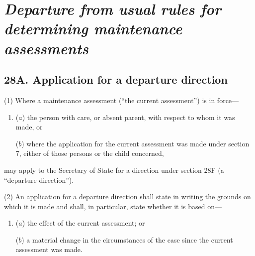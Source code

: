 \documentclass[12pt,a4paper]{article}
\begin{document}
%
%
%

\section{\itshape Departure from usual rules for determining maintenance assessments}

\subsection{28A. Application for a departure direction}

(1) Where a maintenance assessment (“the current assessment”) is in force—
\begin{enumerate}\item[]
($a$) the person with care, or absent parent, with respect to whom it was made, or

($b$) where the application for the current assessment was made under section 7, either of those persons or the child concerned,
\end{enumerate}
may apply to the Secretary of State for a direction under section 28F (a “departure direction”).

(2) An application for a departure direction shall state in writing the grounds on which it is made and shall, in particular, state whether it is based on—
\begin{enumerate}\item[]
($a$) the effect of the current assessment; or

($b$) a material change in the circumstances of the case since the current assessment was made.
\end{enumerate}
\end{document}
